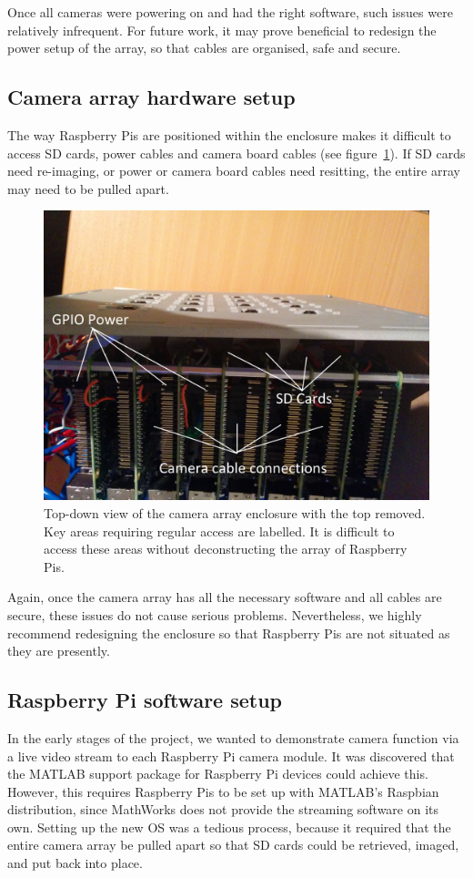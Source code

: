 \documentclass[../main.tex]{subfiles}
\begin{document}
Once all cameras were powering on and had the right software, such issues were relatively infrequent. For future work, it may prove beneficial to redesign the power setup of the array, so that cables are organised, safe and secure. 

\subsection{Camera array hardware setup} \label{sec:challenges-power}
The way Raspberry Pis are positioned within the enclosure makes it difficult to access SD cards, power cables and camera board cables (see figure~\ref{fig:hardware-access}). If SD cards need re-imaging, or power or camera board cables need resitting, the entire array may need to be pulled apart. 

\begin{figure}[H]
    \centering
    \includegraphics[width=0.75\linewidth]{images/hardware-access}
    \caption{Top-down view of the camera array enclosure with the top removed. Key areas requiring regular access are labelled. It is difficult to access these areas without deconstructing the array of Raspberry Pis.}
    \label{fig:hardware-access}
\end{figure}

Again, once the camera array has all the necessary software and all cables are secure, these issues do not cause serious problems. Nevertheless, we highly recommend redesigning the enclosure so that Raspberry Pis are not situated as they are presently.

\subsection{Raspberry Pi software setup}
In the early stages of the project, we wanted to demonstrate camera function via a live video stream to each Raspberry Pi camera module. It was discovered that the MATLAB support package for Raspberry Pi devices could achieve this. However, this requires Raspberry Pis to be set up with MATLAB's Raspbian distribution, since MathWorks does not provide the streaming software on its own. Setting up the new OS was a tedious process, because it required that the entire camera array be pulled apart so that SD cards could be retrieved, imaged, and put back into place.
\end{document}

